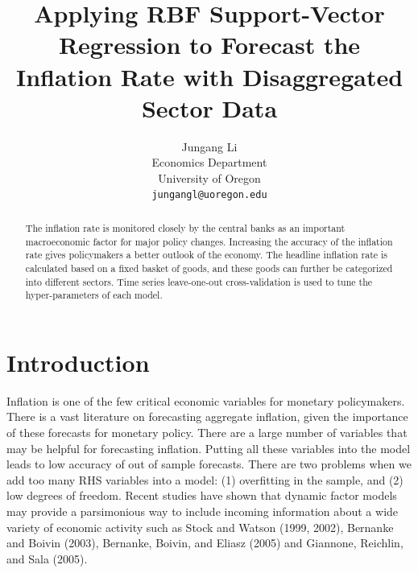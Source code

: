 \documentclass[10pt,twocolumn,letterpaper]{article}
\begin{document}
\title{Applying RBF Support-Vector Regression to Forecast the Inflation Rate with Disaggregated Sector Data  }

\author{Jungang Li\\
Economics Department\\
University of Oregon\\
{\tt\small jungangl@uoregon.edu}
}

\maketitle

\begin{abstract}
The inflation rate is monitored closely by the central banks as an important macroeconomic factor for major policy changes. Increasing the accuracy of the inflation rate gives policymakers a better outlook of the economy. The headline inflation rate is calculated based on a fixed basket of goods, and these goods can further be categorized into different sectors. Time series leave-one-out cross-validation is used to tune the hyper-parameters of each model.  
\end{abstract}
\section{Introduction}
Inflation is one of the few critical economic variables for monetary policymakers. There is a vast literature on forecasting aggregate inflation, given the importance of these forecasts for monetary policy. There are a large number of variables that may be helpful for forecasting inflation. Putting all these variables into the model leads to low accuracy of out of sample forecasts. There are two problems when we add too many RHS variables into a model: (1) overfitting in the sample, and (2) low degrees of freedom. Recent studies have shown that dynamic factor models may provide a parsimonious way to include incoming information about a wide variety of economic activity such as Stock and Watson (1999, 2002), Bernanke and Boivin (2003), Bernanke, Boivin, and Eliasz (2005) and Giannone, Reichlin, and Sala (2005). 
\end{document}
